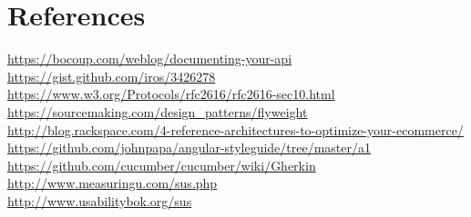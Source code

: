 \documentclass{report}
\begin{document}
\chapter{References}
\url {https://bocoup.com/weblog/documenting-your-api}\\ 
\url {https://gist.github.com/iros/3426278}\\
\url {https://www.w3.org/Protocols/rfc2616/rfc2616-sec10.html} \\
\url {https://sourcemaking.com/design_patterns/flyweight} \\
\url {http://blog.rackspace.com/4-reference-architectures-to-optimize-your-ecommerce/} \\
\url {https://github.com/johnpapa/angular-styleguide/tree/master/a1} \\
\url {https://github.com/cucumber/cucumber/wiki/Gherkin} \\
\url {http://www.measuringu.com/sus.php} \\
\url {http://www.usabilitybok.org/sus} \\
\end{document}
